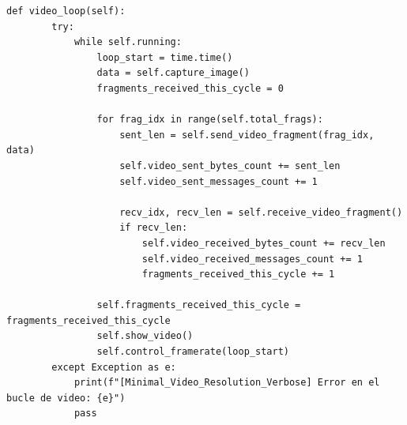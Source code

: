 \begin{lstlisting}[style=pythonstyle, caption={Método video\_loop() de \textit{Minimal\_Video\_Resolution\_verbose}}, label={lst:video_loop_minimal_video_resolution_verbose}]
def video_loop(self):
        try:
            while self.running:
                loop_start = time.time()
                data = self.capture_image()
                fragments_received_this_cycle = 0

                for frag_idx in range(self.total_frags):
                    sent_len = self.send_video_fragment(frag_idx, data)
                    self.video_sent_bytes_count += sent_len
                    self.video_sent_messages_count += 1

                    recv_idx, recv_len = self.receive_video_fragment()
                    if recv_len:
                        self.video_received_bytes_count += recv_len
                        self.video_received_messages_count += 1
                        fragments_received_this_cycle += 1

                self.fragments_received_this_cycle = fragments_received_this_cycle
                self.show_video()
                self.control_framerate(loop_start)
        except Exception as e:
            print(f"[Minimal_Video_Resolution_Verbose] Error en el bucle de video: {e}")
            pass
\end{lstlisting}
\vspace{\baselineskip}

